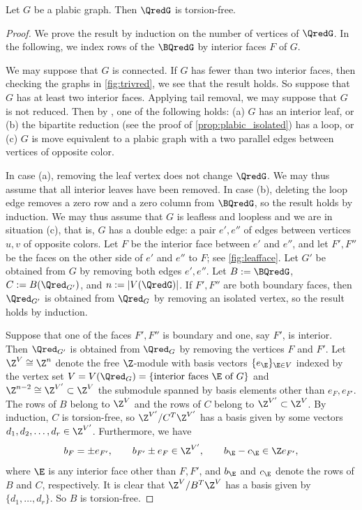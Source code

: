 \begin{proposition}\label{prop:torsionfree}
Let $G$ be a plabic graph. Then $\QredG$ is torsion-free.
\end{proposition}
\begin{proof}
We prove the result by induction on the number of vertices of $\QredG$.  In the following, we index rows of the $\BQredG$ by interior faces $F$ of $G$.

We may suppose that $G$ is connected.  If $G$ has fewer than two interior faces, then checking the graphs in \cref{fig:trivred}, we see that the result holds.  So suppose that $G$ has at least two interior faces.  Applying tail removal, we may suppose that $G$ is not reduced.  Then by \cite{Pos}, one of the following holds: (a) $G$ has an interior leaf, or (b) the bipartite reduction (see the proof of \cref{prop:plabic_isolated}) has a loop, or (c) $G$ is move equivalent to a plabic graph with a two parallel edges between vertices of opposite color.

In case (a), removing the leaf vertex does not change $\QredG$.  We may thus assume that all interior leaves have been removed.  In case (b), deleting the loop edge removes a zero row and a zero column from $\BQredG$, so the result holds by induction.   We may thus assume that $G$ is leafless and loopless and we are in situation (c), that is, $G$ has a double edge: a pair $e',e''$ of edges between vertices $u,v$ of opposite colors.  Let $F$ be the interior face between $e'$ and $e''$, and let $F', F''$ be the faces on the other side of $e'$ and $e''$ to $F$; see \cref{fig:leafface}.   Let $G'$ be obtained from $G$ by removing both edges $e',e''$.  Let $B := \BQredG$, $C := B(\Qred_{G'})$, and $n := |V(\QredG)|$.  If $F',F''$ are both boundary faces, then $\Qred_{G'}$ is obtained from $\Qred_G$ by removing an isolated vertex, so the result holds by induction.  

Suppose that one of the faces $F',F''$ is boundary and one, say $F'$, is interior.    Then $\Qred_{G'}$ is obtained from $\Qred_G$ by removing the vertices $F$ and $F'$.  Let $\Z^V \cong \Z^n$ denote the free $\Z$-module with basis vectors $\{e_\E\}_{\E\in V}$ indexed by the vertex set $V = V(\Qred_G) = \{\mbox{interior faces $\E$ of $G$}\}$ and $\Z^{n-2} \cong \Z^{V'} \subset \Z^V$ the submodule spanned by basis elements other than $e_F, e_{F'}$.  The rows of $B$ belong to $\Z^V$ and the rows of $C$ belong to $\Z^{V'} \subset \Z^V$.  By induction, $C$ is torsion-free, so $\Z^{V'}/C^T \Z^{V'}$ has a basis given by some vectors $d_1,d_2,\ldots,d_r \in \Z^{V'}$.   Furthermore, we have
$$
b_F = \pm e_{F'}, \qquad b_{F'} \pm e_F \in \Z^{V'}, \qquad b_\E - c_\E \in  \Z e_{F'},  
$$
where $\E$ is any interior face other than $F,F'$, and $b_\E$ and $c_\E$ denote the rows of $B$ and $C$, respectively.  It is clear that $\Z^V/B^T \Z^V$ has a basis given by $\{d_1,\ldots,d_r\}$.  So $B$ is torsion-free.


\end{proof}
